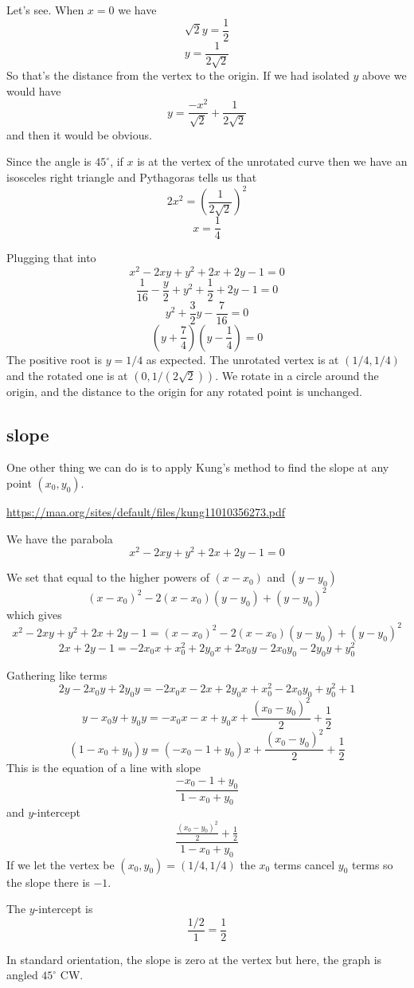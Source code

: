 \documentclass[11pt, oneside]{article}
\begin{document}
Let's see.  When $x = 0$ we have
\[ \sqrt{2} y = \frac{1}{2} \]
\[ y = \frac{1}{2 \sqrt{2}} \]
So that's the distance from the vertex to the origin. If we had isolated $y$ above we would have
\[ y = \frac{-x^2}{\sqrt{2}} + \frac{1}{2 \sqrt{2}} \]
and then it would be obvious.

 Since the angle is $45^{\circ}$, if $x$ is at the vertex of the unrotated curve then we have an isosceles right triangle and Pythagoras tells us that
\[ 2x^2 = (\frac{1}{2 \sqrt{2}})^2 \]
\[ x = \frac{1}{4} \]

Plugging that into
\[ x^2 - 2xy + y^2 + 2x + 2y - 1 = 0 \]
\[ \frac{1}{16} - \frac{y}{2} + y^2 + \frac{1}{2} + 2y - 1 = 0 \]
\[ y^2 + \frac{3}{2} y - \frac{7}{16} = 0 \]
\[ (y + \frac{7}{4})(y - \frac{1}{4}) = 0 \]
The positive root is $y = 1/4$ as expected.  The unrotated vertex is at $(1/4,1/4)$ and the rotated one is at $(0,1/(2\sqrt{2}))$.  We rotate in a circle around the origin, and the distance to the origin for any rotated point is unchanged.

\subsection*{slope}
One other thing we can do is to apply Kung's method to find the slope at any point $(x_0,y_0)$.

\url{https://maa.org/sites/default/files/kung11010356273.pdf}

We have the parabola
\[ x^2 - 2xy + y^2 + 2x + 2y - 1 = 0 \]

We set that equal to the higher powers of $(x-x_0)$ and $(y-y_0)$
\[ (x-x_0)^2 - 2(x-x_0)(y-y_0) + (y-y_0)^2 \]
which gives
\[ x^2 - 2xy + y^2 + 2x + 2y - 1 = (x-x_0)^2 - 2(x-x_0)(y-y_0) + (y-y_0)^2 \]
\[ 2x + 2y - 1 = -2x_0x + x_0^2 + 2y_0x + 2x_0y - 2x_0y_0 -2 y_0y + y_0^2 \]

Gathering like terms
\[ 2y - 2x_0y + 2y_0y = -2x_0 x - 2x + 2y_0x + x_0^2 - 2x_0y_0 + y_0^2 + 1 \]
\[ y - x_0y + y_0y = -x_0 x - x + y_0x + \frac{(x_0 - y_0)^2}{2} + \frac{1}{2} \]
\[ (1 - x_0 + y_0) y = (-x_0 - 1 + y_0) x + \frac{(x_0 - y_0)^2}{2} + \frac{1}{2} \]
This is the equation of a line with slope
\[ \frac{-x_0 - 1 + y_0}{1 - x_0 + y_0} \]
and $y$-intercept
\[ \frac{ \frac{(x_0 - y_0)^2}{2}  + \frac{1}{2}}{1 - x_0 + y_0} \]
If we let the vertex be $(x_0,y_0) = (1/4,1/4)$ the $x_0$ terms cancel $y_0$ terms so the slope there is $-1$.

The $y$-intercept is
\[ \frac{1/2}{1} = \frac{1}{2}  \]

In standard orientation, the slope is zero at the vertex but here, the graph is angled $45^{\circ}$ CW.
\end{document}

